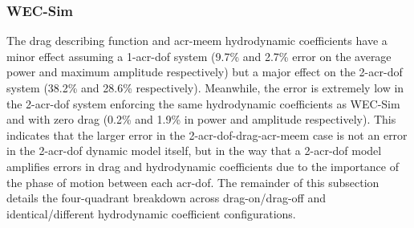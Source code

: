 \subsubsection{WEC-Sim}
The drag describing function and \gls{acr-meem} hydrodynamic coefficients have a minor effect assuming a 1-\gls{acr-dof} system (9.7\% and 2.7\% error on the average power and maximum amplitude respectively) but a major effect on the 2-\gls{acr-dof} system (38.2\% and 28.6\% respectively).
Meanwhile, the error is extremely low in the 2-\gls{acr-dof} system enforcing the same hydrodynamic coefficients as WEC-Sim and with zero drag (0.2\% and 1.9\% in power and amplitude respectively).
This indicates that the larger error in the 2-\gls{acr-dof}-drag-\gls{acr-meem} case is not an error in the 2-\gls{acr-dof} dynamic model itself, but in the way that a 2-\gls{acr-dof} model amplifies errors in drag and hydrodynamic coefficients due to the importance of the phase of motion between each \gls{acr-dof}.
The remainder of this subsection details the four-quadrant breakdown across drag-on/drag-off and identical/different hydrodynamic coefficient configurations.

